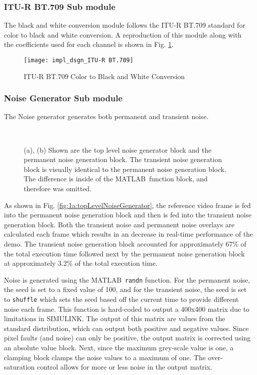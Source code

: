 \subsubsection{ITU-R BT.709 Sub module}
The black and white conversion module follows the ITU-R BT.709 standard for color to black and white conversion. A reproduction of this module along with the coefficients used for each channel is shown in Fig. \ref{fig:btu709}.
\begin{figure}[H]
    \texttt{[image: impl\_dsgn\_ITU-R BT.709]}
    \caption{ITU-R BT.709 Color to Black and White Conversion}
    \label{fig:btu709}
\end{figure}

\subsubsection{Noise Generator Sub module}
The Noise generator generates both permanent and transient noise.
\begin{figure}[ht!]
    \\
    \caption{(a), (b) Shown are the top level noise generator block and the permanent noise generation block. The transient noise generation block is visually identical to the permanent noise generation block. The difference is inside of the MATLAB\textregisteredmark\ function block, and therefore was omitted.}
    \label{fig:noiseGenerator}
\end{figure}
\par As shown in Fig. \ref{fig:1a:topLevelNoiseGenerator}, the reference video frame is fed into the permanent noise generation block and then is fed into the transient noise generation block. Both the transient noise and permanent noise overlays are calculated each frame which results in an decrease in real-time performance of the demo. The transient noise generation block accounted for approximately 67\% of the total execution time followed next by the permanent noise generation block at approximately 3.2\% of the total execution time.
\par Noise is generated using the MATLAB\textregisteredmark\ \verb!randn! function. For the permanent noise, the seed is set to a fixed value of 100, and for the transient noise, the seed is set to \verb!shuffle! which sets the seed based off the current time to provide different noise each frame. This function is hard-coded to output a 400x400 matrix due to limitations in SIMULINK\textregisteredmark. The output of this matrix are values from the standard distribution, which can output both positive and negative values. Since pixel faults (and noise) can only be positive, the output matrix is corrected using an absolute value block. Next, since the maximum grey-scale value is one, a clamping block clamps the noise values to a maximum of one. The over-saturation control allows for more or less noise in the output matrix.
